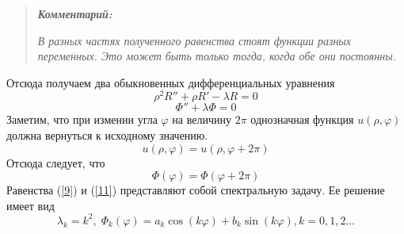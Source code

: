 \documentclass[14pt, a4paper]{extarticle}
\let\oldref\ref
\renewcommand{\ref}[1]{(\oldref{#1})}
\begin{document}
		\begin{framed}
			\begin{quote}
				\textit{\textbf{Комментарий:}} 
				
				\textit{В разных частях полученного равенства стоят функции разных переменных.
					Это может быть только тогда, когда обе они постоянны.}
			\end{quote}
		\end{framed}
		
		Отсюда получаем два обыкновенных дифференциальных уравнения
		\begin{equation}
			\rho^2 R'' + \rho R' - \lambda R = 0 \label{8}
		\end{equation}
		\begin{equation}
			\Phi'' + \lambda \Phi = 0 \label{9}
		\end{equation}
		Заметим, что при измении угла $\varphi$ на величину $2\pi$ однозначная функция $u(\rho, \varphi)$ должна вернуться к исходному значению.
		\begin{equation}
			u(\rho, \varphi) = u(\rho, \varphi + 2\pi)
		\end{equation}
		Отсюда следует, что 
		\begin{equation}
			\Phi(\varphi) = \Phi(\varphi + 2\pi) \label{11}
		\end{equation}
		Равенства \ref{9} и \ref{11} представляют собой спектральную задачу. Ее решение имеет вид
		\begin{equation}
			\lambda_k = k^2, \; \Phi_k(\varphi) = a_k\cos(k\varphi) + b_k\sin(k\varphi), k = 0,1,2...
		\end{equation}
\end{document}
